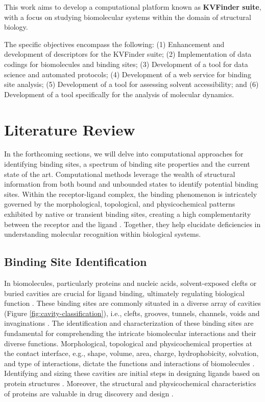 \documentclass[Ingles]{phdthesis}
\def\ie{i.e.\onedot}
\def\eg{e.g.\onedot}
\begin{document}
This work aims to develop a computational platform known as \textbf{KVFinder suite}, with a focus on studying biomolecular systems within the domain of structural biology.

The specific objectives encompass the following: (1) Enhancement and development of descriptors for the KVFinder suite; (2) Implementation of data codings for biomolecules and binding sites; (3) Development of a tool for data science and automated protocols; (4) Development of a web service for binding site analysis; (5) Development of a tool for assessing solvent accessibility; and (6) Development of a tool specifically for the analysis of molecular dynamics.


\chapter{Literature Review}

In the forthcoming sections, we will delve into computational approaches for identifying binding sites, a spectrum of binding site properties and the current state of the art. Computational methods leverage the wealth of structural information from both bound and unbounded states to identify potential binding sites. Within the receptor-ligand complex, the binding phenomenon is intricately governed by the morphological, topological, and physicochemical patterns exhibited by native or transient binding sites, creating a high complementarity between the receptor and the ligand \cite{holyoak2013,sotriffer2002,henrich2010,guerra2019}. Together, they help elucidate deficiencies in understanding molecular recognition within biological systems.

\section{Binding Site Identification \label{sec:cavity-detection}}

In biomolecules, particularly proteins and nucleic acids, solvent-exposed clefts or buried cavities are crucial for ligand binding, ultimately regulating biological function \cite{liang1998,sotriffer2002,henrich2010}. These binding sites are commonly situated in a diverse array of cavities (Figure \ref{fig:cavity-classification}), \ie, clefts, grooves, tunnels, channels, voids and invaginations \cite{simoes2017,guerra2019}. The identification and characterization of these binding sites are fundamental for comprehending the intricate biomolecular interactions and their diverse functions. Morphological, topological and physicochemical properties at the contact interface, \eg, shape, volume, area, charge, hydrophobicity, solvation, and type of interactions, dictate the functions and interactions of biomolecules \cite{hubbard1994,bohacek1997,sotriffer2002,henrich2010,guerra2019}. Identifying and sizing these cavities are initial steps in designing ligands based on protein structures \cite{liang1998}. Moreover, the structural and physicochemical characteristics of proteins are valuable in drug discovery and design \cite{guerra2019}.
\end{document}
